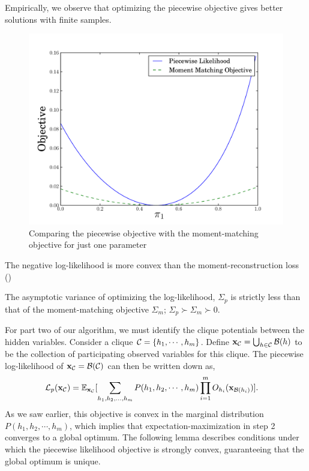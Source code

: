 Empirically, we observe that optimizing the piecewise objective gives
  better solutions with finite samples.

\begin{figure}
  \centering
  \label{fig:piecewise-objective}
  \includegraphics[width=\columnwidth]{figures/piecewise-objective.pdf}
  \caption{Comparing the piecewise objective with the moment-matching objective for just one parameter}
\end{figure}

The negative log-likelihood is more convex than the moment-reconstruction loss ()

\begin{corollary}
  The asymptotic variance of optimizing the log-likelihood, $\Sigma_p$
  is strictly less than that of the moment-matching objective
  $\Sigma_m$; $\Sigma_p \succ \Sigma_m \succ 0$.
\end{corollary}

For part two of our algorithm, we must identify the clique potentials between the
  hidden variables. 
Consider a clique $\mathcal{C} = \{h_1, \cdots, h_m\}$. 
Define $\mathbf{x}_{\mathcal{C}} = \bigcup_{h \in \mathcal{C}} \mathcal{B}(h)$ to be the collection of
  participating observed variables for this clique.
The piecewise log-likelihood of $\mathbf{x}_{\mathcal{C}} =\mathcal{B}(\mathcal{C})$ can then be
  written down as,
\begin{align}
  \mathcal{L}_p(\mathbf{x}_{\mathcal{C}}) 
    &= \mathbb{E}_{\mathbf{x}_{\mathcal{C}}}[ \sum_{h_1, h_2, \ldots, h_m} P(h_1, h_2, \cdots, h_m) 
    \prod_{i=1}^{m} O_{h_i}(\mathbf{x}_{\mathcal{B}(h_i)}) ]. \label{eqn:piecewise}
\end{align}
As we saw earlier, this objective is convex in the marginal distribution
  $P(h_1, h_2, \cdots, h_m)$, which implies that
  expectation-maximization in step 2 converges to a global optimum.
The following lemma describes conditions under which the piecewise
  likelihood objective is strongly convex, guaranteeing that the global
  optimum is unique.


